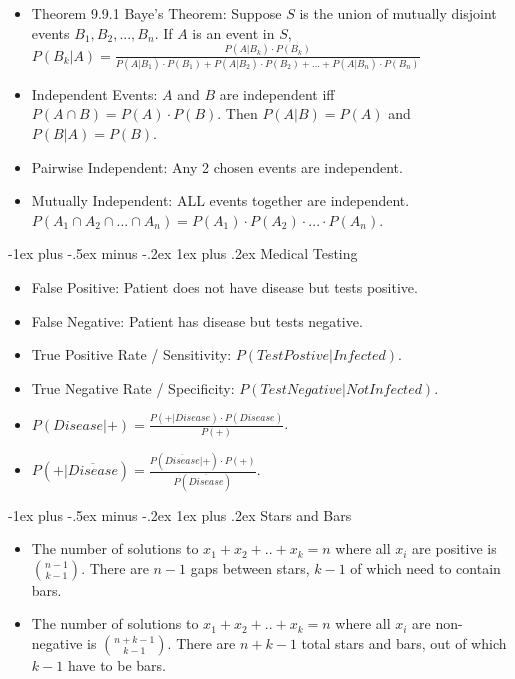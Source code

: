 \documentclass[10pt, portrait]{article}
\makeatletter
\renewcommand{\subsection}{\@startsection{subsection}{3}{0mm}%
                                {-1ex plus -.5ex minus -.2ex}%
                                {1ex plus .2ex}%
                                {\normalfont\small\bfseries}}%
\makeatother
\begin{document}
\begin{multicols*}{2}
\begin{itemize}
    \item Theorem 9.9.1 Baye's Theorem: Suppose $S$ is the union of mutually disjoint events $B_1,B_2, ..., B_n$. If $A$ is an event in $S$, $P(B_k|A)=\frac{P(A|B_k) \cdot P(B_k)}{P(A|B_1) \cdot P(B_1) + P(A|B_2) \cdot P(B_2) + ... + P(A|B_n) \cdot P(B_n) }$
    \item Independent Events: $A$ and $B$ are independent iff $P(A \cap B) = P(A) \cdot P(B)$. Then $P(A|B)=P(A)$ and $P(B|A)=P(B)$.
    \item Pairwise Independent: Any 2 chosen events are independent.
    \item Mutually Independent: ALL events together are independent. $P(A_1 \cap A_2 \cap ... \cap A_n)=P(A_1) \cdot P(A_2) \cdot ... \cdot P(A_n)$.
\end{itemize}

\subsection{Medical Testing}
\begin{itemize}
    \item False Positive: Patient does not have disease but tests positive.
    \item False Negative: Patient has disease but tests negative.
    \item True Positive Rate / Sensitivity: $P(Test Postive | Infected)$.
    \item True Negative Rate / Specificity: $P(Test Negative | Not Infected)$.
    \item $P(Disease|+)=\frac{P(+|Disease) \cdot P(Disease)}{P(+)}$.
    \item $P(+|\overline{Disease})=\frac{P(\overline{Disease}|+) \cdot P(+)}{P(\overline{Disease})}$.
\end{itemize}

\subsection{Stars and Bars}
\begin{itemize}
    \item The number of solutions to $x_1+x_2+..+x_k=n$ where all $x_i$ are positive is $n-1 \choose k-1$. There are $n-1$ gaps between stars, $k-1$ of which need to contain bars.
    \item The number of solutions to $x_1+x_2+..+x_k=n$ where all $x_i$ are non-negative is $n+k-1 \choose k-1$. There are $n+k-1$ total stars and bars, out of which $k-1$ have to be bars.
\end{itemize}


\end{multicols*}
\end{document}
